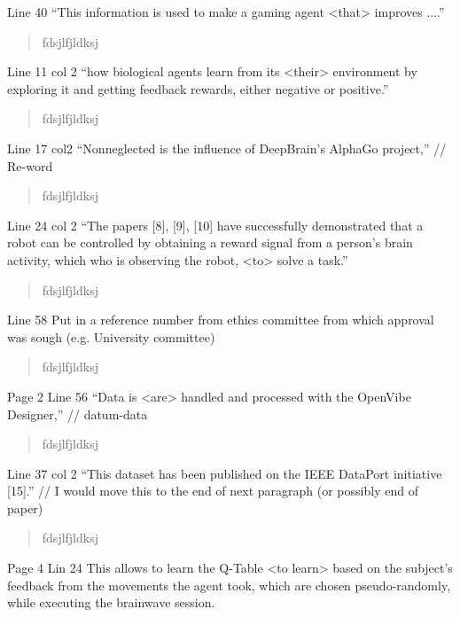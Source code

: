 \documentclass[journal,onecolumn,12pt]{IEEEtran}
\begin{document}
Line 40 “This information is used to make a gaming agent <that> improves ....”

\begin{quotation}
{\color{blue}
fdsjlfjldksj
}
\end{quotation}

Line 11 col 2 “how biological agents learn from its <their> environment by exploring it and getting feedback rewards, either negative or positive.”

\begin{quotation}
{\color{blue}
fdsjlfjldksj
}
\end{quotation}

Line 17 col2 “Nonneglected is the influence of DeepBrain’s AlphaGo project,” // Re-word

\begin{quotation}
{\color{blue}
fdsjlfjldksj
}
\end{quotation}

Line 24 col 2 “The papers [8], [9], [10] have successfully demonstrated that a robot can be controlled by obtaining a reward signal from a person’s brain activity, which who is observing the robot, <to> solve a task.”

\begin{quotation}
{\color{blue}
fdsjlfjldksj
}
\end{quotation}

Line 58 Put in a reference number from ethics committee from which approval was sough (e.g. University committee)

\begin{quotation}
{\color{blue}
fdsjlfjldksj
}
\end{quotation}

Page 2
Line 56 “Data is <are> handled and processed with the OpenVibe Designer,” // datum-data

\begin{quotation}
{\color{blue}
fdsjlfjldksj
}
\end{quotation}

Line 37 col 2 “This dataset has been published on the IEEE DataPort initiative [15].” // I would move this to the end of next paragraph (or possibly end of paper)

\begin{quotation}
{\color{blue}
fdsjlfjldksj
}
\end{quotation}

Page 4
Lin 24 This allows to learn the Q-Table <to learn> based on the subject’s feedback from the movements the agent
took, which are chosen pseudo-randomly, while executing the brainwave session.
\end{document}
